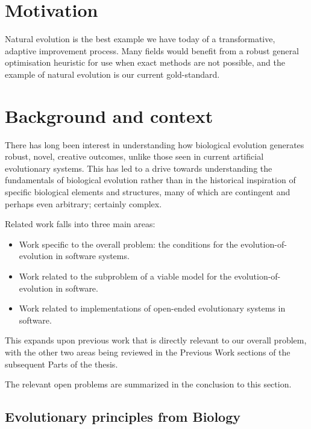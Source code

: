 \section{Motivation}

Natural evolution is the best example we have today of a transformative, adaptive improvement process. Many fields would benefit from a robust general optimisation heuristic for use when exact methods are not possible, and the example of natural evolution is our current gold-standard. 
	
\section{Background and context}\label{background-and-context}

There has long been interest in understanding how biological evolution generates robust, novel, creative outcomes, unlike those seen in current artificial evolutionary systems. This has led to a drive towards understanding the fundamentals of biological evolution rather than in the historical inspiration of specific biological elements and structures, many of which are contingent and perhaps even arbitrary; certainly complex.

Related work falls into three main areas:

\begin{itemize}
\item Work specific to the overall problem: the conditions for the evolution-of-evolution in software systems.
\item Work related to the subproblem of a viable model for the evolution-of-evolution in software.
\item Work related to implementations of open-ended evolutionary systems in software.
\end{itemize}
	
This  expands upon previous work that is directly relevant to our overall problem, with the other two areas being reviewed in the Previous Work sections of the subsequent Parts of the thesis. 

The relevant open problems are summarized in the conclusion to this section.

\subsection{Evolutionary principles from Biology}

